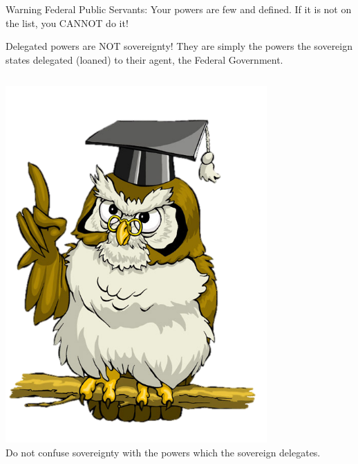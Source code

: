 \begin{frame}
    \begin{varblock}[0.8\textwidth]{Warning}
        Federal Public Servants: Your powers are few and defined. If it is not on the list, you CANNOT do it!
    \end{varblock}
\end{frame}

\begin{frame}
    Delegated powers are NOT sovereignty! They are simply the powers the
    sovereign states delegated (loaned) to their agent, the Federal Government.
\end{frame}

\begin{frame}
    \begin{columns}[c]
            \centering
            \includegraphics[width=0.75\textwidth]{img/owl.png} \\
        \column{0.5\textheight}
            \Large{Do not confuse sovereignty with the powers which the sovereign delegates.}
    \end{columns}
\end{frame}

